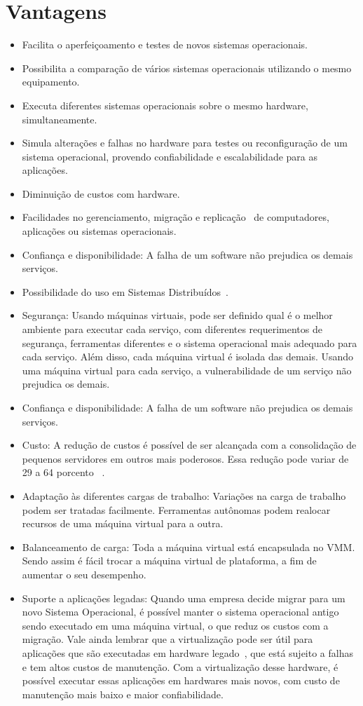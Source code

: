 \section{Vantagens}
\begin{itemize}
    \item Facilita o aperfeiçoamento e testes de novos sistemas operacionais.
    \item Possibilita a comparação de vários sistemas operacionais utilizando o mesmo equipamento.
    \item Executa diferentes sistemas operacionais sobre o mesmo hardware, simultaneamente.
    \item Simula alterações e falhas no hardware para testes ou reconfiguração de um sistema operacional, provendo confiabilidade e escalabilidade para as aplicações.
    \item Diminuição de custos com hardware.
    \item Facilidades no gerenciamento, migração e replicação~\cite{comer} de computadores, aplicações ou sistemas operacionais.
    \item Confiança e disponibilidade: A falha de um software não prejudica os demais serviços.
    \item Possibilidade do uso em Sistemas Distribuídos~\cite{dantas}.
    \item  Segurança: Usando máquinas virtuais, pode ser definido qual é o melhor ambiente para
executar cada serviço, com diferentes requerimentos de segurança, ferramentas diferentes e o sistema operacional mais adequado para cada serviço. Além disso, cada máquina virtual é isolada das demais. Usando uma máquina virtual para cada serviço, a
vulnerabilidade de um serviço não prejudica os demais.
\item  Confiança e disponibilidade: A falha de um software não prejudica os demais serviços.
\item Custo: A redução de custos é possível de ser alcançada com a consolidação de pequenos
servidores em outros mais poderosos. Essa redução pode variar de 29 a 64 porcento ~\cite{ferrazani}.
\item  Adaptação às diferentes cargas de trabalho: Variações na carga de trabalho podem ser
tratadas facilmente. Ferramentas autônomas podem realocar recursos de uma máquina virtual para a outra.
\item Balanceamento de carga: Toda a máquina virtual está encapsulada no VMM. Sendo assim é fácil trocar a máquina virtual de plataforma, a fim de aumentar o seu desempenho.
\item Suporte a aplicações legadas: Quando uma empresa decide migrar para um novo Sistema Operacional, é possível manter o sistema operacional antigo sendo executado em uma máquina virtual, o que reduz os custos com a migração. Vale ainda lembrar que
a virtualização pode ser útil para aplicações que são executadas em hardware legado~\cite{ferrazani}, que está sujeito a falhas e tem altos custos de manutenção. Com a virtualização desse hardware, é possível executar essas aplicações em hardwares mais novos, com custo de
manutenção mais baixo e maior confiabilidade.
 \end{itemize}
 
